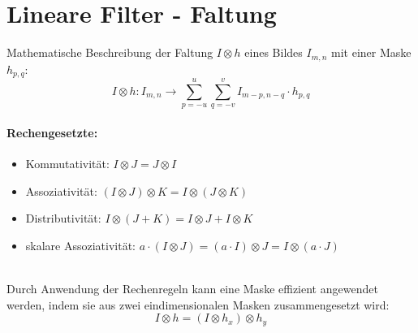 



\section{Lineare Filter - Faltung}
Mathematische Beschreibung der Faltung $I \otimes h$ eines Bildes $I_{m,n}$ mit einer Maske $h_{p,q}$:
\[
	I \otimes h:I_{m,n} \rightarrow \sum_{p=-u}^{u}\sum_{q=-v}^{v} I_{m-p,n-q} \cdot h_{p,q}
\]
\paragraph{Rechengesetzte:}
\begin{itemize}
	\item[]Kommutativität: $I \otimes J = J \otimes I$
	\item[]Assoziativität: $(I \otimes J) \otimes K = I \otimes (J \otimes K)$
	\item[]Distributivität: $I \otimes (J + K) = I \otimes J + I \otimes K$
	\item[]skalare Assoziativität: $a \cdot (I \otimes J) = (a \cdot I) \otimes J = I \otimes (a \cdot J)$
\end{itemize}
~\\
Durch Anwendung der Rechenregeln kann eine Maske effizient angewendet werden,
indem sie aus zwei eindimensionalen Masken zusammengesetzt wird:
\[
	I \otimes h = (I \otimes h_x) \otimes h_y
\]

